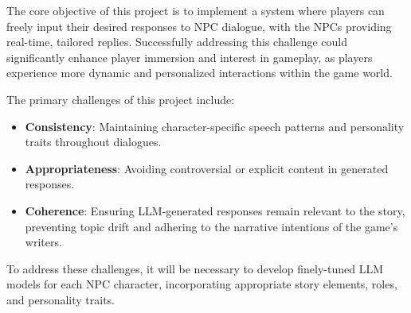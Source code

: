 \documentclass{article}
\begin{document}
The core objective of this project is to implement a system where players can freely input their desired responses to NPC dialogue, with the NPCs providing real-time, tailored replies. Successfully addressing this challenge could significantly enhance player immersion and interest in gameplay, as players experience more dynamic and personalized interactions within the game world.

The primary challenges of this project include:
\begin{itemize}
    \item \textbf{Consistency}: Maintaining character-specific speech patterns and personality traits throughout dialogues.
    \item \textbf{Appropriateness}: Avoiding controversial or explicit content in generated responses.
    \item \textbf{Coherence}: Ensuring LLM-generated responses remain relevant to the story, preventing topic drift and adhering to the narrative intentions of the game's writers.
\end{itemize}

To address these challenges, it will be necessary to develop finely-tuned LLM models for each NPC character, incorporating appropriate story elements, roles, and personality traits.
\end{document}
